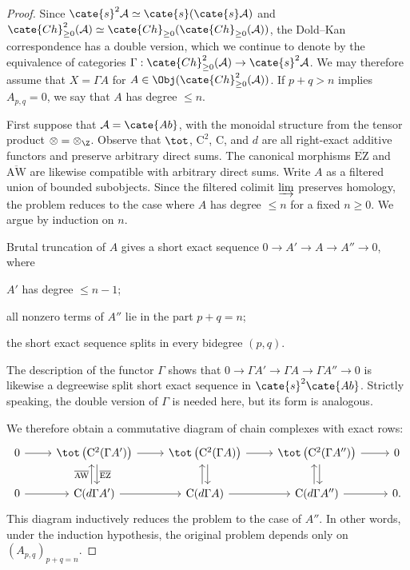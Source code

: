 \begin{proof}
	Since $\cate{s}^2\mathcal{A}\simeq\cate{s}(\cate{s}\mathcal{A})$ and
	$\cate{Ch}^2_{\geq0}(\mathcal{A})\simeq
	\cate{Ch}_{\geq0}(\cate{Ch}_{\geq0}(\mathcal{A}))$, the Dold--Kan
	correspondence has a double version, which we continue to denote by the
	equivalence of categories
	$\Gamma:\cate{Ch}^2_{\geq0}(\mathcal{A})\to\cate{s}^2\mathcal{A}$.
	We may therefore assume that $X=\Gamma A$ for
	$A\in\Obj(\cate{Ch}^2_{\geq0}(\mathcal{A}))$. If $p+q>n$ implies
	$A_{p,q}=0$, we say that $A$ has degree $\leq n$.

	First suppose that $\mathcal{A}=\cate{Ab}$, with the monoidal structure
	from the tensor product $\otimes=\otimes_{\Z}$. Observe that $\tot$,
	$\mathrm{C}^2$, $\mathrm{C}$, and $d$ are all right-exact additive
	functors and preserve arbitrary direct sums. The canonical morphisms
	$\overline{\mathrm{EZ}}$ and $\overline{\mathrm{AW}}$ are likewise
	compatible with arbitrary direct sums. Write $A$ as a filtered union of
	bounded subobjects. Since the filtered colimit $\varinjlim$ preserves
	homology, the problem reduces to the case where $A$ has degree $\leq n$
	for a fixed $n\geq0$. We argue by induction on $n$.

	Brutal truncation of $A$ gives a short exact sequence
	$0\to A'\to A\to A''\to0$, where
	\begin{compactitem}
		\item $A'$ has degree $\leq n-1$;
		\item all nonzero terms of $A''$ lie in the part $p+q=n$;
		\item the short exact sequence splits in every bidegree $(p,q)$.
	\end{compactitem}
	The description of the functor $\Gamma$ shows that
	$0\to\Gamma A'\to\Gamma A\to\Gamma A''\to0$ is likewise a degreewise
	split short exact sequence in $\cate{s}^2\cate{Ab}$. Strictly speaking,
	the double version of $\Gamma$ is needed here, but its form is analogous.

	We therefore obtain a commutative diagram of chain complexes with exact
	rows:
	\[\begin{tikzcd}
		0 \arrow[r] & \tot\left( \mathrm{C}^2(\Gamma A') \right) \arrow[shift left, d, "\overline{\mathrm{EZ}}"] \arrow[r] & \tot\left( \mathrm{C}^2(\Gamma A) \right) \arrow[shift left, d] \arrow[r] & \tot\left( \mathrm{C}^2(\Gamma A'') \right) \arrow[shift left, d] \arrow[r] & 0 \\
		0 \arrow[r] & \mathrm{C}(d\Gamma A') \arrow[shift left, u, "\overline{\mathrm{AW}}"] \arrow[r] & \mathrm{C}(d\Gamma A) \arrow[shift left, u] \arrow[r] & \mathrm{C}(d\Gamma A'') \arrow[shift left, u] \arrow[r] & 0.
	\end{tikzcd}\]
	This diagram inductively reduces the problem to the case of $A''$. In
	other words, under the induction hypothesis, the original problem depends
	only on $(A_{p,q})_{p+q=n}$.


\end{proof}
